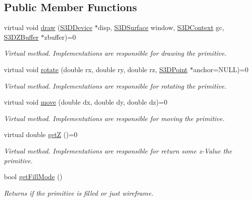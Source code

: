 \subsection*{Public Member Functions}
\begin{DoxyCompactItemize}
\item 
virtual void \hyperlink{class_s3_d_primitive_a857f042bc63ae6233b63b60089e92b81}{draw} (\hyperlink{types_8h_a25c0773a29204332721bde1b164d0b84}{S3DDevice} $\ast$disp, \hyperlink{types_8h_a4afc89c514af26434688c7e8b382ba5e}{S3DSurface} window, \hyperlink{types_8h_a46f30693e0040340e595d8228cc31779}{S3DContext} gc, \hyperlink{class_s3_d_z_buffer}{S3DZBuffer} $\ast$zbuffer)=0
\begin{DoxyCompactList}\small\item\em Virtual method. Implementations are responsible for drawing the primitive. \item\end{DoxyCompactList}\item 
virtual void \hyperlink{class_s3_d_primitive_a23eb36b6bd48643e8f7be4b950592d9e}{rotate} (double rx, double ry, double rz, \hyperlink{class_s3_d_point}{S3DPoint} $\ast$anchor=NULL)=0
\begin{DoxyCompactList}\small\item\em Virtual method. Implementations are responsible for rotating the primitive. \item\end{DoxyCompactList}\item 
virtual void \hyperlink{class_s3_d_primitive_a73a178ec2e1aa8e95f01baf0552724a9}{move} (double dx, double dy, double dz)=0
\begin{DoxyCompactList}\small\item\em Virtual method. Implementations are responsible for moving the primitive. \item\end{DoxyCompactList}\item 
virtual double \hyperlink{class_s3_d_primitive_ab5b06d3a8e83216cc42554bb78afd2d9}{getZ} ()=0
\begin{DoxyCompactList}\small\item\em Virtual method. Implementations are responsible for return some z-\/Value the primitive. \item\end{DoxyCompactList}\item 
bool \hyperlink{class_s3_d_primitive_a36948fee7526b4c0634d16372ebb3e56}{getFillMode} ()
\begin{DoxyCompactList}\small\item\em Returns if the primitive is filled or just wireframe. \item\end{DoxyCompactList}\item 

\end{DoxyCompactItemize}
